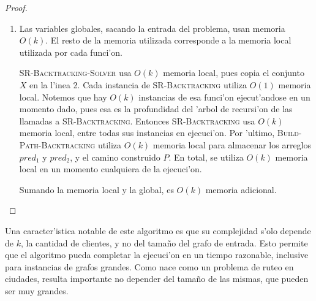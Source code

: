 \begin{theorem}
\begin{proof}
\begin{enumerate}
\begin{claim}
\begin{proof}
\noindent
Como $1 / n! \leq 1 / 2^{n - 1}$ para todo $n \in \mathbb{N}$, es

\[N(k) \leq k! \left(\frac{1}{2^{k - 2}} + \frac{1}{2^{k - 3}} + \dots + \frac{1}{2^0}\right)\]

\noindent
Usando que $\frac{1}{2^{k - 2}} + \frac{1}{2^{k - 3}} + \dots + \frac{1}{2^0} < 2$, llegamos a la desigualdad deseada.

\end{proof}
\end{claim}

En definitiva, hay $\Theta(k!)$ nodos internos, sacando a la ra'iz. Como el costo de todo nodo interno es $O(1)$, el costo total de los mismos es $O(k!)$. Luego, la suma de los costos de todos los nodos, salvo la ra'iz, es $O(k \cdot k!)$.

La funci'on \textsc{Build-Path-Backtracking} es claramente $O(k)$, costo que es absorbido por la complejidad de \textsc{SR-Backtracking}. Sumando todo, llegamos a que el costo de \textsc{SR-Backtracking-Solver} es $O(k \cdot k!)$.

\item Las variables globales, sacando la entrada del problema, usan memoria $O(k)$. El resto de la memoria utilizada corresponde a la memoria local utilizada por cada funci'on.

\textsc{SR-Backtracking-Solver} usa $O(k)$ memoria local, pues copia el conjunto $X$ en la l'inea 2. Cada instancia de \textsc{SR-Backtracking} utiliza $O(1)$ memoria local. Notemos que hay $O(k)$ instancias de esa funci'on ejecut'andose en un momento dado, pues esa es la profundidad del 'arbol de recursi'on de las llamadas a \textsc{SR-Backtracking}. Entonces \textsc{SR-Backtracking} usa $O(k)$ memoria local, entre todas sus instancias en ejecuci'on. Por 'ultimo, \textsc{Build-Path-Backtracking} utiliza $O(k)$ memoria local para almacenar los arreglos $pred_1$ y $pred_2$, y el camino construido $P$. En total, se utiliza $O(k)$ memoria local en un momento cualquiera de la ejecuci'on.

Sumando la memoria local y la global, es $O(k)$ memoria adicional.
\end{enumerate}
\end{proof}
\end{theorem}

Una caracter'istica notable de este algoritmo es que su complejidad s'olo depende de $k$, la cantidad de clientes, y no del tama\~no del grafo de entrada. Esto permite que el algoritmo pueda completar la ejecuci'on en un tiempo razonable, inclusive para instancias de grafos grandes. Como  nace como un problema de ruteo en ciudades, resulta importante no depender del tama\~no de las mismas, que pueden ser muy grandes.

